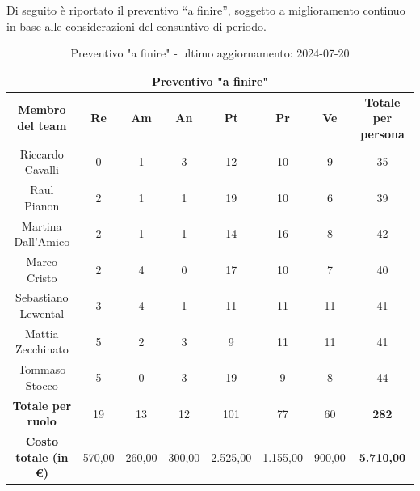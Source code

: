 \begin{minipage}{\textwidth}
Di seguito è riportato il preventivo “a finire”, soggetto a miglioramento continuo in base alle considerazioni del consuntivo di periodo.
\begin{table}[H]
  \centering
  \begin{adjustbox}{max width=\textwidth}
  \begin{tabular}{|c|c|c|c|c|c|c|c|}
    \hline
    \multicolumn{8}{|c|}{\textbf{Preventivo "a finire"}} \\
    \hline
    \textbf{Membro del team} & \textbf{Re} & \textbf{Am} & \textbf{An} & \textbf{Pt} & \textbf{Pr} & \textbf{Ve} & \textbf{Totale per persona} \\
    \hline
    Riccardo Cavalli & 0 & 1 & 3 & 12 & 10 & 9 & 35 \\
    \hline
    Raul Pianon & 2 & 1 & 1 & 19 & 10 & 6 & 39 \\
    \hline
    Martina Dall'Amico & 2 & 1 & 1 & 14 & 16 & 8 & 42 \\
    \hline
    Marco Cristo & 2 & 4 & 0 & 17 & 10 & 7 & 40 \\
    \hline
    Sebastiano Lewental & 3 & 4 & 1 & 11 & 11 & 11 & 41 \\
    \hline
    Mattia Zecchinato & 5 & 2 & 3 & 9 & 11 & 11 & 41 \\
    \hline
    Tommaso Stocco & 5 & 0 & 3 & 19 & 9 & 8 & 44 \\
    \hline
    \textbf{Totale per ruolo} & 19 & 13 & 12 & 101 & 77 & 60 & \textbf{282} \\
    \hline
    \textbf{Costo totale (in €)} & 570,00 & 260,00 & 300,00 & 2.525,00 & 1.155,00 & 900,00 & \textbf{5.710,00} \\
    \hline
  \end{tabular}
  \end{adjustbox}
  \caption{Preventivo "a finire" - ultimo aggiornamento: 2024-07-20}\label{tab:preventivo-a-finire}
\end{table}
\end{minipage}
